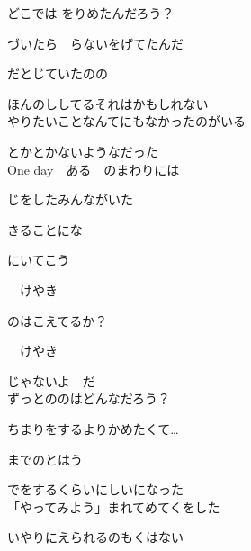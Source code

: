 どこでは をりめたんだろう？

づいたら　らないをげてたんだ

だとじていたのの

ほんのししてるそれはかもしれない
\\

やりたいことなんてにもなかったのがいる

とかとかないようなだった
\\

One day　ある　のまわりには

じをしたみんながいた

きることにな

にいてこう

　けやき

のはこえてるか？

　けやき

じゃないよ　だ
\\

ずっとののはどんなだろう？

ちまりをするよりかめたくて…

までのとはう

でをするくらいにしいになった
\\

「やってみよう」まれてめてくをした

いやりにえられるのもくはない
\\

